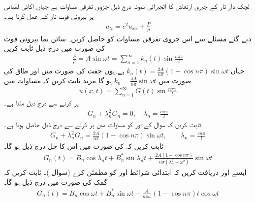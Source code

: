 \quad لچک دار تار کے جبری ارتعاش کا الجبرائی نمونہ درج ذیل جزوی تفرقی مساوات  ہے جہاں اکائی لمبائی پر  بیرونی قوت   تار کے   عمل کرتا ہے۔
\begin{align}\label{مساوات_جزوی_تار_جبری_الف}
u_{tt}=c^2u_{xx}+\frac{P}{\rho}
\end{align} 
دیے گئے مسئلے سے اس جزوی تفرقی مساوات کو حاصل کریں۔
\quad
سائن نما بیرونی قوت  کی صورت میں درج ذیل ثابت کریں
\begin{align*}
\frac{P}{\rho}=A\sin \omega t=\sum_{n=1}^{\infty} k_n(t)\sin \frac{n\pi x}{l}
\end{align*}
جہاں 
$k_n(t)=\tfrac{2A}{n\pi}(1-\cos n\pi)\sin \omega t$
 ہے۔یوں جفت  کی صورت میں  اور طاق  کی صورت میں 
$k_n=\tfrac{4A}{n\pi}\sin \omega t$
ہو گا۔مزید ثابت کریں کہ مساوات  میں
\begin{align*}
u(x,t)=\sum_{n=1}^{\infty} G(t)\sin \frac{n\pi x}{l}
\end{align*}
پر کرنے سے درج ذیل ملتا ہے۔
\begin{align*}
\ddot{G}_n+\lambda^2_n G_n=0,\quad \lambda_n=\frac{cn\pi}{l}
\end{align*}
\quad
ثابت کریں کہ  سوال  کے  اور  کو مساوات  میں پر کرنے سے درج ذیل حاصل ہوتا ہے۔
\begin{align*}
\ddot{G}_n+\lambda^2_nG_n=\frac{2A}{n\pi}(1-\cos n\pi)\sin\omega t,\quad \quad \lambda_n=\frac{cn\pi}{l}
\end{align*}  
ثابت کریں کہ  کی صورت میں اس کا حل درج ذیل ہو گا۔
\begin{align*}
G_n(t)=B_n\cos\lambda_nt+B^*_n\sin\lambda_nt+\frac{2A(1-\cos n\pi)}{n\pi(\lambda^2_n-\omega^2)}\sin \omega t
\end{align*}
\quad
ایسے  اور  دریافت کریں کہ  ابتدائی شرائط  اور  کو مطمئن کرے (سوال )۔
\quad
ثابت کریں کہ گمک  کی صورت میں درج ذیل ہو گا۔
\begin{align*}
G_n(t)=B_n\cos \omega t+B^*_n\sin\omega t-\frac{A}{n\pi \omega}(1-\cos n\pi)t\cos \omega t
\end{align*}

